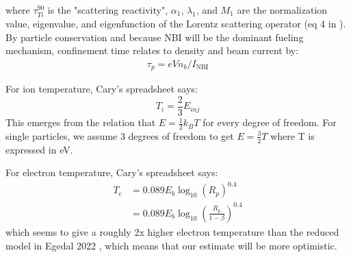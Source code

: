 where $\tau^{90}_{Ti}$ is the "scattering reactivity", $\alpha_1$, $\lambda_1$, and $M_1$ are the normalization value, eigenvalue, and eigenfunction of the Lorentz scattering operator (eq 4 in \cite{Egedal_2022}). 
By particle conservation and because NBI will be the dominant fueling mechanism, confinement time relates to density and beam current by:
\begin{align}
    \tau_p = e V n_b / I_\text{NBI}
\end{align}

For ion temperature, Cary's spreadsheet says:
\begin{equation}
    T_i = \frac{2}{3} E_{inj}
\end{equation}
This emerges from the relation that $E=\frac{1}{2}k_BT$ for every degree of freedom. For single particles, we assume 3 degrees of freedom to get $E=\frac{3}{2}T$ where T is expressed in eV. 

For electron temperature, Cary's spreadsheet says:
\begin{align}
    T_e &= 0.089 E_b \log_{10} \left( R_p \right)^{0.4} \\
    &= 0.089 E_b \log_{10} \left(\frac{R_p}{1-\beta} \right)^{0.4}
\end{align}
which seems to give a roughly 2x higher electron temperature than the reduced model in Egedal 2022 \cite{Egedal_2022}, which means that our estimate will be more optimistic.

